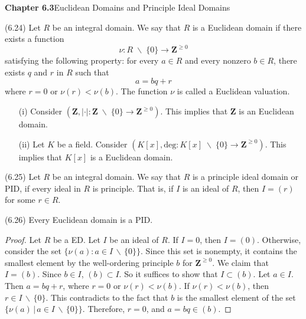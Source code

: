 \vspace{2ex}
{\bf Chapter 6.3}\hspace{2ex}Euclidean Domains and Principle Ideal Domains 
\\
\begin{defi}
(6.24) Let $R$ be an integral domain. We say that $R$ is a Euclidean domain if there exists a function
\[\nu :R\;\backslash\;\{0\}\rightarrow {\bm Z}^{\geq 0}\]
satisfying the following property: for every $a\in R$ and every nonzero $b\in R$, there exists $q$ and $r$ in $R$ such that
\[a=bq+r\]
where $r=0$ or $\nu (r)<\nu (b)$. The function $\nu $ is called a Euclidean valuation.
\end{defi}
\vspace{2ex}
\begin{ex}
\begin{itemize}
\item[(i)] Consider $({\bm Z},|\cdot |:{\bm Z}\;\backslash\;\{0\}\rightarrow {\bm Z}^{\geq 0})$. This implies that ${\bm Z}$ is an Euclidean domain.
\item[(ii)] Let $K$ be a field. Consider $(K[x],\mathrm{deg}:K[x]\;\backslash\;\{0\}\rightarrow {\bm Z}^{\geq 0})$. This implies that $K[x]$ is a Euclidean domain.
\end{itemize}
\end{ex}
\vspace{2ex}
\begin{defi}
(6.25) Let $R$ be an integral domain. We say that $R$ is a principle ideal domain or PID, if every ideal in $R$ is principle. That is, if $I$ is an ideal of $R$, then $I=(r)$ for some $r\in R$.
\end{defi}
\vspace{2ex}
\begin{thm}
(6.26) Every Euclidean domain is a PID.
\end{thm}
\vspace{2ex}
\begin{proof}
Let $R$ be a ED. Let $I$ be an ideal of $R$. If $I=0$, then $I=(0)$. Otherwise, consider the set $\{\nu (a):a\in I\,\backslash\,\{0\}\}$. Since this set is nonempty, it contains the smallest element by the well-ordering principle $b$ for ${\bm Z}^{\geq 0}$. We claim that $I=(b)$. Since $b\in I$, $(b)\subset I$. So it suffices to show that $I\subset (b)$. Let $a\in I$. Then $a=bq+r$, where $r=0$ or $\nu (r)<\nu (b)$. If $\nu (r)<\nu (b)$, then $r\in I\,\backslash\,\{0\}$. This contradicts to the fact that $b$ is the smallest element of the set $\{\nu (a) \,|\, a\in I\,\backslash\,\{0\}\}$. Therefore, $r=0$, and $a=bq\in (b)$. 
\end{proof}
